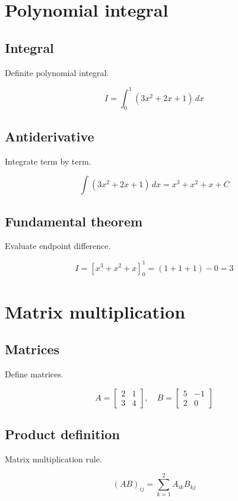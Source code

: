 \documentclass[11pt,a4paper]{article}
\begin{document}
\section{Polynomial integral}

\subsection{Integral}
Definite polynomial integral.
\begin{derivationbox}
\[
I=\int_0^1 (3x^2+2x+1)\,dx
\]
\end{derivationbox}

\subsection{Antiderivative}
Integrate term by term.
\begin{derivationbox}
\[
\int (3x^2+2x+1)\,dx=x^3+x^2+x+C
\]
\end{derivationbox}

\subsection{Fundamental theorem}
Evaluate endpoint difference.
\begin{derivationbox}
\[
I=\left[x^3+x^2+x\right]_0^1=(1+1+1)-0=3
\]
\end{derivationbox}

\section{Matrix multiplication}

\subsection{Matrices}
Define matrices.
\begin{derivationbox}
\[
A=\begin{bmatrix}2&1\\3&4\end{bmatrix},\quad B=\begin{bmatrix}5&-1\\2&0\end{bmatrix}
\]
\end{derivationbox}

\subsection{Product definition}
Matrix multiplication rule.
\begin{derivationbox}
\[
(AB)_{ij}=\sum_{k=1}^{2}A_{ik}B_{kj}
\]
\end{derivationbox}
\end{document}
